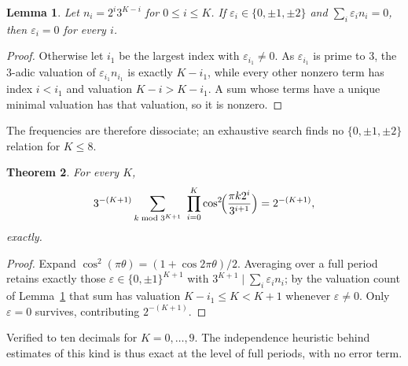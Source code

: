 \documentclass[11pt]{article}
\newtheorem{theorem}{Theorem}
\newtheorem{lemma}[theorem]{Lemma}
\theoremstyle{remark}
\newcommand{\eps}{\varepsilon}
\begin{document}
\begin{lemma}\label{lem:dis}
Let $n_i=2^i3^{K-i}$ for $0\le i\le K$. If $\eps_i\in\{0,\pm1,\pm2\}$ and $\sum_i\eps_in_i=0$, then
$\eps_i=0$ for every $i$.
\end{lemma}

\begin{proof}
Otherwise let $i_1$ be the largest index with $\eps_{i_1}\ne0$. As $\eps_{i_1}$ is prime to $3$, the
$3$-adic valuation of $\eps_{i_1}n_{i_1}$ is exactly $K-i_1$, while every other nonzero term has index
$i<i_1$ and valuation $K-i>K-i_1$. A sum whose terms have a unique minimal valuation has that valuation,
so it is nonzero.
\end{proof}

The frequencies are therefore dissociate; an exhaustive search finds no $\{0,\pm1,\pm2\}$ relation for
$K\le8$.

\begin{theorem}\label{thm:period}
For every $K$,
\begin{equation}\label{eq:period}
  3^{-(K+1)}\sum_{k \bmod 3^{K+1}}\ \prod_{i=0}^{K}\cos^2\!\Bigl(\frac{\pi k2^i}{3^{i+1}}\Bigr)=2^{-(K+1)},
\end{equation}
exactly.
\end{theorem}

\begin{proof}
Expand $\cos^2(\pi\theta)=(1+\cos2\pi\theta)/2$. Averaging over a full period retains exactly those
$\eps\in\{0,\pm1\}^{K+1}$ with $3^{K+1}\mid\sum_i\eps_in_i$; by the valuation count of
Lemma~\ref{lem:dis} that sum has valuation $K-i_1\le K<K+1$ whenever $\eps\ne0$. Only $\eps=0$ survives,
contributing $2^{-(K+1)}$.
\end{proof}

Verified to ten decimals for $K=0,\dots,9$. The independence heuristic behind estimates of this kind is
thus exact at the level of full periods, with no error term.
\end{document}
